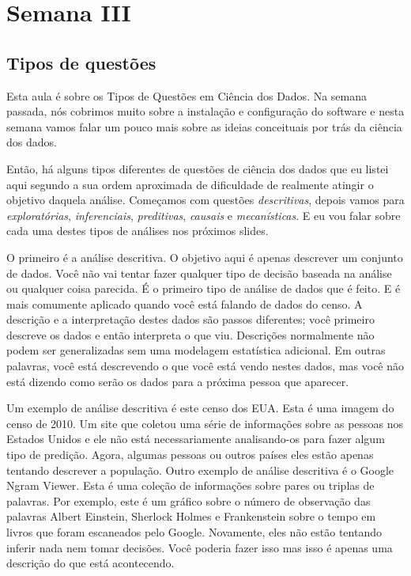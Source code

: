 \section{Semana III}


\subsection{Tipos de questões}

\begin{multicols}{2}
\begin{footnotesize}
Esta aula é sobre os Tipos de Questões em Ciência dos Dados. Na semana passada, nós cobrimos muito sobre a instalação e configuração do software e nesta semana vamos falar um pouco mais sobre as ideias conceituais por trás da ciência dos dados. 

Então, há alguns tipos diferentes de questões de ciência dos dados que eu listei aqui segundo a sua ordem aproximada de dificuldade de realmente atingir o objetivo daquela análise. Começamos com questões \emph{descritivas}, depois vamos para \emph{exploratórias}, \emph{inferenciais}, \emph{preditivas}, \emph{causais} e \emph{mecanísticas}. E eu vou falar sobre cada uma destes tipos de análises nos próximos slides.

O primeiro é a análise descritiva. O objetivo aqui é apenas descrever um conjunto de dados. Você não vai tentar fazer qualquer tipo de decisão baseada na análise ou qualquer coisa parecida. É o primeiro tipo de análise de dados que é feito. E é mais comumente aplicado quando você está falando de dados do censo. 
A descrição e a interpretação destes dados são passos diferentes; você primeiro descreve os dados e então interpreta o que viu. 
Descrições normalmente não podem ser generalizadas sem uma modelagem estatística adicional. Em outras palavras, você está descrevendo o que você está vendo nestes dados, mas você não está dizendo como serão os dados para a próxima pessoa que aparecer. 

Um exemplo de análise descritiva é este censo dos EUA. Esta é uma imagem do censo de 2010. Um site que coletou uma série de informações sobre as pessoas nos Estados Unidos e ele não está necessariamente analisando-os para fazer algum tipo de predição. Agora, algumas pessoas ou outros países eles estão apenas tentando descrever a população. Outro exemplo de análise descritiva é o Google Ngram Viewer. Esta é uma coleção de informações sobre pares ou triplas de palavras. Por exemplo, este é um gráfico sobre o número de observação das palavras Albert Einstein, Sherlock Holmes e Frankenstein sobre o tempo em livros que foram escaneados pelo Google. Novamente, eles não estão tentando inferir nada nem tomar decisões. Você poderia fazer isso mas isso é apenas uma descrição do que está acontecendo. 


\end{footnotesize}
\end{multicols}
